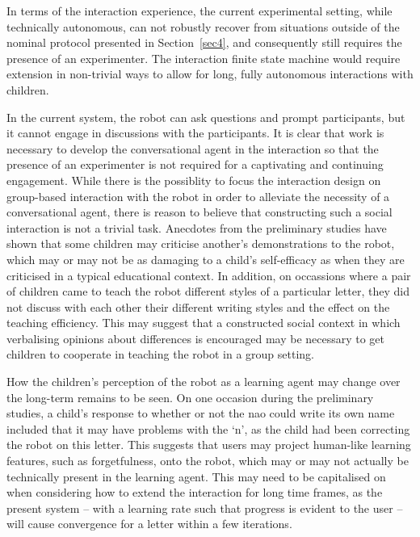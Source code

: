 \documentclass{sig-alternate}
\begin{document}
In terms of the interaction experience, the current experimental setting, while
technically autonomous, can not robustly recover from situations outside of the
nominal protocol presented in Section~\ref{sec4}, and consequently still
requires the presence of an experimenter. The interaction finite state machine would
require extension in non-trivial ways to allow for long, fully autonomous
interactions with children.

In the current system, the robot can ask questions and prompt participants, but it 
cannot engage in discussions with the participants. It is clear that work is necessary 
to develop the conversational agent in the interaction so that the presence of an 
experimenter is not required for a captivating and continuing engagement. While there is the 
possiblity to focus the interaction design on group-based interaction with the robot 
in order to alleviate the necessity of a conversational agent, there is reason to 
believe that constructing such a social interaction is not a trivial task. Anecdotes 
from the preliminary studies have shown that some children may criticise another's 
demonstrations to the robot, which may or may not be as damaging to a child's 
self-efficacy as when they are criticised in a typical educational context. In addition,
on occassions where a pair of children came to teach the robot different styles of a 
particular letter, they did not discuss with each other their different writing styles 
and the effect on the teaching efficiency. This may suggest that a constructed social context in 
which verbalising opinions about differences is encouraged may be necessary to get children 
to cooperate in teaching the robot in a group setting.  

How the children's perception of the robot as a learning agent may change over the 
long-term remains to be seen. On one occasion during the preliminary studies, a 
child's response to whether or not the {\sc nao} could write its own name included that it 
may have problems with the `n', as the child had been correcting the robot on this 
letter. This suggests that users may project human-like learning features, such as 
forgetfulness, onto the robot, which may or may not actually be technically present 
in the learning agent. This may need to be capitalised on when considering how to 
extend the interaction for long time frames, as the present system -- with a learning rate 
such that progress is evident to the user -- will cause convergence for a letter within a 
few iterations.
\end{document}
